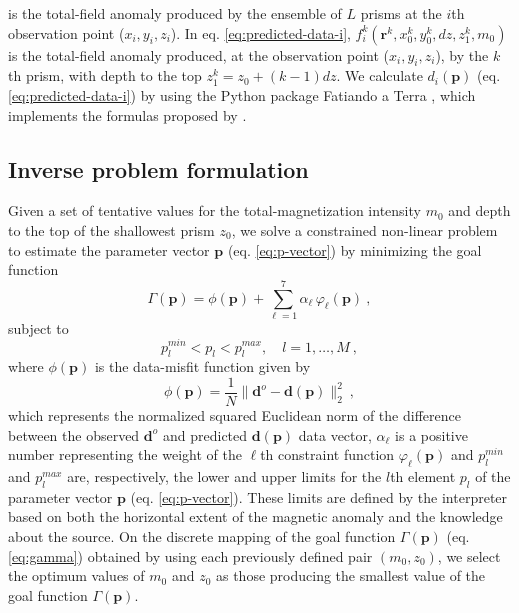 is the total-field anomaly produced by the ensemble of $L$ prisms at the $i$th observation point ($x_{i}, y_{i}, z_{i}$). In eq. \ref{eq:predicted-data-i}, $f_{i}^{k}(\mathbf{r}^{k}, x_{0}^{k}, y_{0}^{k}, dz, z_{1}^{k}, m_{0})$ is the total-field anomaly produced, at the observation point ($x_{i}, y_{i}, z_{i}$), by the $k$th prism, with depth to the top $z_{1}^{k} = z_{0} + (k-1)dz$. We calculate $d_{i} (\mathbf{p})$ (eq. \ref{eq:predicted-data-i}) by using the Python package Fatiando a Terra \cite[]{uieda-etal2013}, which implements the formulas proposed by \cite{plouff1976}.

\subsection{Inverse problem formulation}

Given a set of tentative values for the total-magnetization intensity $m_{0}$ and 
depth to the top of the shallowest prism $z_{0}$, we solve a constrained non-linear 
problem to estimate the parameter vector $\mathbf{p}$ (eq. \ref{eq:p-vector}) 
by minimizing the goal function
\begin{equation}
\Gamma (\mathbf{p}) = \phi (\mathbf{p}) + \sum\limits^{7}_{\ell =1} \alpha_{\ell} \, \varphi_{\ell}(\mathbf{p}) \: ,
\label{eq:gamma}
\end{equation}
subject to
\begin{equation}
p_{l}^{min} < p_{l} < p_{l}^{max}, \quad l = 1, \dots, M \: ,
\label{eq:inequality-constraint}
\end{equation}
where $\phi (\mathbf{p})$ is the data-misfit function given by
\begin{equation}\label{eq:misfit}
\phi (\mathbf{p}) = \frac{1}{N} \| \mathbf{d}^{o} - \mathbf{d}(\mathbf{p}) \|_{2}^{2} \: ,
\end{equation}
which represents the normalized squared Euclidean norm of the difference between the 
observed $\mathbf{d}^{o}$ and predicted $\mathbf{d}(\mathbf{p})$ data vector,
$\alpha_{\ell}$ is a positive number representing the weight of the $\ell$th constraint 
function $\varphi_{\ell}(\mathbf{p})$ and $p_{l}^{min}$ and $p_{l}^{max}$ are, 
respectively, the lower and upper limits for the $l$th element $p_{l}$ of the parameter 
vector $\mathbf{p}$ (eq. \ref{eq:p-vector}). These limits are defined by the interpreter 
based on both the horizontal extent of the magnetic anomaly and the knowledge about the 
source.
On the discrete mapping of the goal function $\Gamma (\mathbf{p})$ 
(eq. \ref{eq:gamma}) obtained by using each previously defined pair $(m_{0}, z_{0})$, 
we select the optimum values of $m_{0}$ and $z_{0}$ 
as those producing the smallest value of the goal function $\Gamma (\mathbf{p})$.

